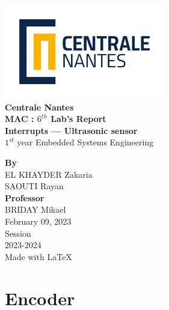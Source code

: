 \documentclass{article}
\begin{document}
\makeatletter
\begin{titlepage}
\begin{center}
    
\includegraphics[width=7cm]{assets/LogoCN_Q.png}
\\
\textbf{\large{Centrale Nantes}}
\\[2cm]

\textbf{\large{MAC : $6^{th}$ Lab's Report \\
Interrupts --- Ultrasonic sensor }}
\\[14pt]
$1^{st}$ year Embedded Systems Engineering
\\[2cm]


\vfill

\textbf{By} \\
EL KHAYDER Zakaria \\
SAOUTI Rayan
\\[1cm]

\textbf{Professor} \\
BRIDAY Mikael
\\[3cm]

February 09, 2023 \\ [12pt]

Session \\
2023-2024 \\[12pt]
\small{Made with \LaTeX}
\end{center}
\end{titlepage}
\makeatother

\pagebreak

\setcounter{page}{1}

\clearpage
{}
\tableofcontents

\clearpage
{}
\lstlistoflistings

\clearpage

\setcounter{page}{1}

\section{Encoder}
\end{document}
